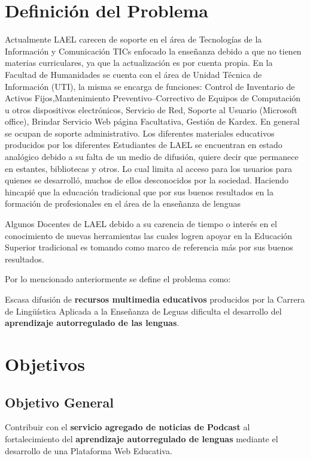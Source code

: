 \section{Definici\'{o}n del Problema}
Actualmente LAEL carecen de soporte en el área de Tecnologías de la Información y Comunicación TICs enfocado la enseñanza
debido a que no tienen materias curriculares, ya que la actualización es por cuenta propia. En la Facultad de Humanidades 
se cuenta con el área de Unidad Técnica de Información (UTI), la misma se encarga de funciones: Control de Inventario de 
Activos Fijos,Mantenimiento Preventivo–Correctivo de Equipos de Computación u otros dispositivos electrónicos, Servicio de Red,
Soporte al Usuario (Microsoft office), Brindar Servicio Web página Facultativa, Gestión de Kardex. En general se ocupan de 
soporte administrativo. Los diferentes materiales educativos producidos por los diferentes Estudiantes de LAEL se encuentran
en estado analógico debido a su falta de un medio de difusión, quiere decir que permanece en estantes, bibliotecas y otros. 
Lo cual limita al acceso para los usuarios para quienes se desarrolló, muchos de ellos desconocidos por la sociedad.
Haciendo hincapié que la educación tradicional que por sus buenos resultados en la formación de profesionales en el área de 
la enseñanza de lenguas

Algunos Docentes de LAEL debido a su carencia de tiempo o interés en el conocimiento de nuevas herramientas las cuales logren
apoyar en la Educación Superior tradicional es tomando como marco de referencia más por sus buenos resultados.

Por lo mencionado anteriormente se define el problema como:

Escasa difusi\'{o}n de \textbf{recursos multimedia educativos} producidos por la Carrera de Lingüística Aplicada a la Enseñanza 
de Leguas dificulta el desarrollo del \textbf{aprendizaje autorregulado de las lenguas}.

\section{Objetivos}

\subsection{Objetivo General}

Contribuir con el \textbf{servicio agregado de noticias de Podcast} al fortalecimiento
del \textbf{aprendizaje autorregulado de lenguas} mediante el desarrollo de una
Plataforma Web Educativa.

